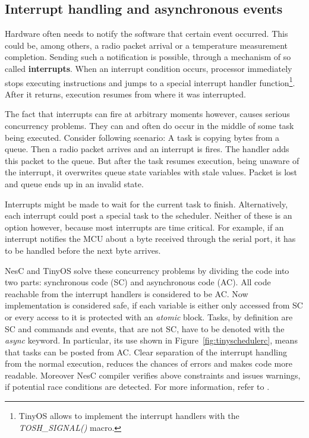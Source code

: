 \subsection{Interrupt handling and asynchronous events}
\label{sec:interrupts_and_async}

Hardware often needs to notify the software that certain event
occurred. This could be, among others, a radio packet arrival or a temperature
measurement completion. Sending such a notification is possible,
through a mechanism of so called {\bf interrupts}. When an interrupt
condition occurs, processor immediately stops executing instructions
and jumps to a special interrupt handler function\footnote{TinyOS
allows to implement the interrupt handlers with the
\emph{TOSH\_SIGNAL()} macro.}. After it returns, execution resumes
from where it was interrupted.

The fact that interrupts can fire at arbitrary moments however, causes serious
concurrency problems. They can and often do occur in the middle of
some task being executed.  Consider following scenario: A task is
copying bytes from a queue. Then a radio packet arrives and an interrupt is
fires. The handler adds this packet to the queue. But after the task
resumes execution, being unaware of the interrupt, it overwrites queue
state variables with stale values.  Packet is lost and queue ends up
in an invalid state.

Interrupts might be made to wait for the current task to finish.
Alternatively, each interrupt could post a special task to the
scheduler. Neither of these is an option however, because most
interrupts are time critical. For example, if an interrupt notifies
the MCU about a byte received through the serial port, it has to be
handled before the next byte arrives.

NesC and TinyOS solve these concurrency problems by dividing the code
into two parts: synchronous code (SC) and asynchronous code (AC).  All
code reachable from the interrupt handlers is considered to be AC.
Now implementation is considered safe, if each variable is either only
accessed from SC or every access to it is protected with an
\emph{atomic} block. Tasks, by definition are SC and commands and
events, that are not SC, have to be denoted with the \emph{async}
keyword. In particular, its use shown in
Figure~\ref{fig:tinyschedulerc}, means that tasks can be posted from
AC. Clear separation of the interrupt handling from the normal execution,
reduces the chances of errors and makes code more readable. Moreover  NesC
compiler verifies above constraints and issues warnings, if potential
race conditions are detected. For more information, refer to
\cite[ch. 8]{NesCMan}.

